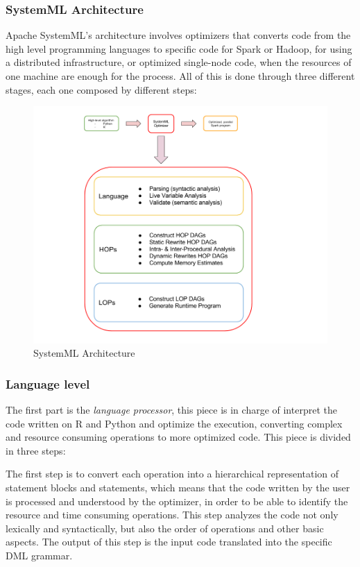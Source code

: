 \documentclass[11pt]{article} %
\begin{document}
    \subsubsection{SystemML Architecture}

      Apache SystemML's architecture involves optimizers that converts code from the high level programming languages to specific code for Spark or Hadoop, for using a distributed infrastructure, or optimized single-node code, when the resources of one machine are enough for the process. All of this is done through three different stages, each one composed by different steps:

      \begin{figure}[!ht]
        \centering
        \includegraphics[width=\textwidth]{systemml_structure.png}
        \caption{SystemML Architecture}
        \label{img:systemml_architecture}
      \end{figure}

      \subsubsection*{Language level}

        The first part is the \emph{language processor}, this piece is in charge of interpret the code written on R and Python and optimize the execution, converting complex and resource consuming operations to more optimized code. This piece is divided in three steps:

        The first step is to convert each operation into a hierarchical representation of statement blocks and statements, which means that the code written by the user is processed and understood by the optimizer, in order to be able to identify the resource and time consuming operations. This step analyzes the code not only lexically and syntactically, but also the order of operations and other basic aspects. The output of this step is the input code translated into the specific DML grammar.
\end{document}
